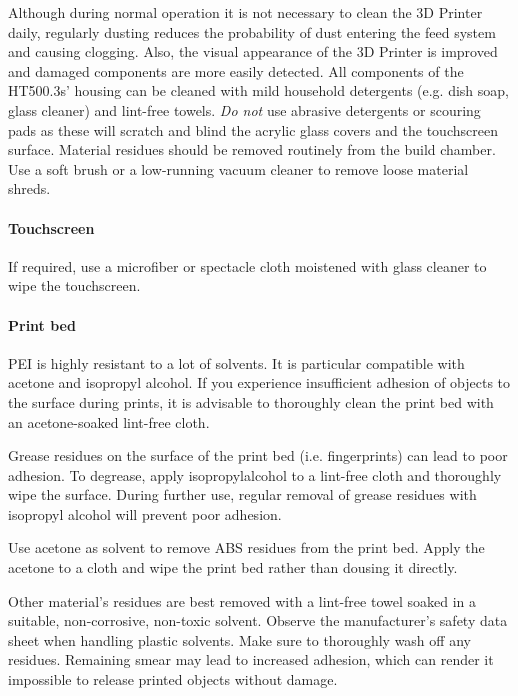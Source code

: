Although during normal operation it is not necessary to clean the 3D Printer daily, regularly dusting reduces the probability of dust entering the feed system and causing clogging. Also, the visual appearance of the 3D Printer is improved and damaged components are more easily detected.
All components of the HT500.3s' housing can be cleaned with mild household detergents (e.g. dish soap, glass cleaner) and lint-free towels.
\emph{Do not} use abrasive detergents or scouring pads as these will scratch and blind the acrylic glass covers and the touchscreen surface.
Material residues should be removed routinely from the build chamber. Use a soft brush or a low-running vacuum cleaner to remove loose material shreds.

\paragraph{Touchscreen}

If required, use a microfiber or spectacle cloth moistened with glass cleaner to wipe the touchscreen.

\paragraph{Print bed}

PEI is highly resistant to a lot of solvents. It is particular compatible with acetone and isopropyl alcohol. If you experience insufficient adhesion of objects to the surface during prints, it is advisable to thoroughly clean the print bed with an acetone-soaked lint-free cloth.

Grease residues on the surface of the print bed (i.e. fingerprints) can lead to poor adhesion. To degrease, apply isopropylalcohol to a lint-free cloth and thoroughly wipe the surface. During further use, regular removal of grease residues with isopropyl alcohol will prevent poor adhesion.

Use acetone as solvent to remove ABS residues from the print bed. Apply the acetone to a cloth and wipe the print bed rather than dousing it directly.

Other material's residues are best removed with a lint-free towel soaked in a suitable, non-corrosive, non-toxic solvent. Observe the manufacturer's safety data sheet when handling plastic solvents. Make sure to thoroughly wash off any residues. Remaining smear may lead to increased adhesion, which can render it impossible to release printed objects without damage.

